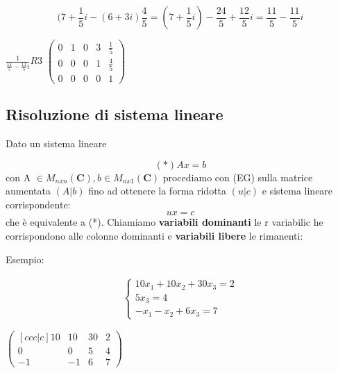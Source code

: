 \documentclass[12pt]{article}
\begin{document}
\[(7+\frac{1}{5}i - (6+3i)\frac{4}{5} = (7+\frac{1}{5}i) - \frac{24}{5} + \frac{12}{5}i = \frac{11}{5} - \frac{11}{5}i\]

\begin{center}
$\frac{1}{\frac{11}{5} - \frac{11}{5}i}R3$
$\begin{pmatrix}
  0 & 1 & 0 & 3 & \frac{1}{5}\\
  0 & 0 & 0 & 1 & \frac{4}{5}\\
  0 & 0 & 0 & 0 & 1
\end{pmatrix}$
\end{center}

\subsection{Risoluzione di sistema lineare}

Dato un sistema lineare

\[(*)  Ax = b\]
con A $\in M_{nxn} (\mathbf{C}), b \in M_{nx1} (\mathbf{C})$ procediamo con (EG) sulla matrice aumentata $(A | b)$ fino ad ottenere la forma ridotta $(u | c)$ e sistema lineare corrispondente:
\[ux = c\]
che è equivalente a (*). Chiamiamo \textbf{variabili dominanti} le r variabilic he corrispondono alle colonne dominanti e \textbf{variabili libere} le rimanenti:

Esempio:

\begin{align*}
  \begin{cases}
    10x_1 + 10x_2 + 30x_3 = 2\\
    5x_3 = 4\\
    -x_1 - x_2 + 6x_3 = 7
  \end{cases}
\end{align*}

\begin{center}
$\begin{pmatrix}[ccc|c]
  10 & 10 & 30 & 2\\
  0 & 0 & 5 & 4\\
  -1 & -1 & 6 & 7
\end{pmatrix}$
\end{center}
\end{document}
